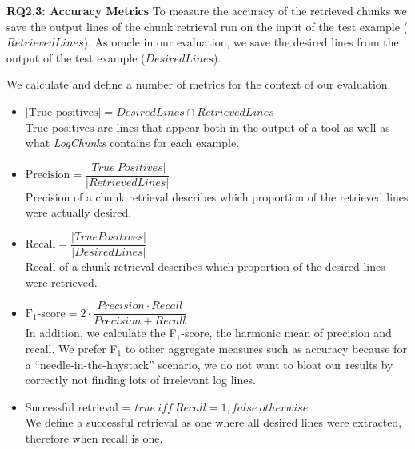 \noindent
\textbf{RQ2.3: Accuracy Metrics}
To measure the accuracy of the retrieved chunks we save the output lines of the chunk retrieval run on the input of the test example ($\mathit{RetrievedLines}$).
As oracle in our evaluation, we save the desired lines from the output of the test example ($\mathit{DesiredLines}$).

We calculate and define a number of metrics for the context of our evaluation.

\vspace{0.2cm}
\begin{itemize}[leftmargin=0.4cm]
	 \itemsep1em
	\item $|\mbox{True positives}| = \mathit{DesiredLines} \cap \mathit{RetrievedLines}$ \vspace{0.2cm}\\
        True positives are lines that appear both in the output of a tool as well as what \textit{LogChunks} contains for each example. 
	\item $\mbox{Precision} = \dfrac{|\mathit{True\ Positives}|}{|\mathit{RetrievedLines}|}$ \vspace{0.21cm} \\
        Precision of a chunk retrieval describes which proportion of the retrieved lines were actually desired. 
	\item $\mbox{Recall} = \dfrac{|\mathit{TruePositives}|}{|\mathit{DesiredLines}|}$ \vspace{0.2cm} \\
        Recall of a chunk retrieval describes which proportion of the desired lines were retrieved.
	\item $\mbox{F$_{1}$-score} = 2 \cdot \dfrac{\mathit{Precision} \cdot \mathit{Recall}}{\mathit{Precision} + \mathit{Recall}}$ \vspace{0.2cm}\\
        In addition, we calculate the F$_{1}$-score, the harmonic mean of precision and recall. We prefer F$_{1}$ to other aggregate measures such as accuracy because for a ``needle-in-the-haystack'' scenario, we do not want to bloat our results by correctly not finding lots of irrelevant log lines.
	\item Successful retrieval = $\mathit{true}\ \mathit{iff}\ \mathit{Recall} = 1, \mathit{false\ otherwise}$  \vspace{0.2cm} \\ We define a successful retrieval as one where all desired lines were extracted, therefore when recall is one.
\end{itemize}

